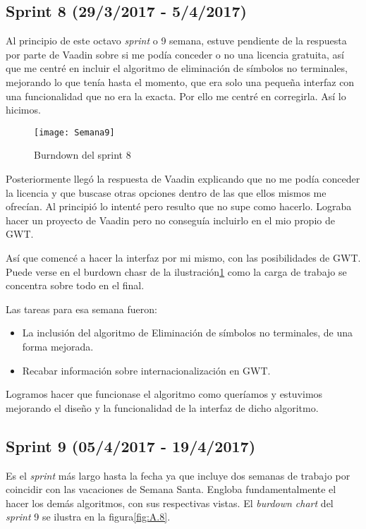 \subsection{Sprint 8 (29/3/2017 - 5/4/2017)}

Al principio de este octavo \emph{sprint} o 9 semana, estuve pendiente de la respuesta por parte de Vaadin sobre si me podía conceder o no una licencia gratuita, así que me centré en incluir el algoritmo de eliminación de símbolos no terminales, mejorando lo que tenía hasta el momento, que era solo una pequeña interfaz con una funcionalidad que no era la exacta. Por ello me centré en corregirla. Así lo hicimos.

\begin{figure}[h]
\centering
\texttt{[image: Semana9]}
\caption{Burndown del sprint 8}
\label{fig:A.7}
\end{figure}

Posteriormente llegó la respuesta de Vaadin explicando que no me podía conceder la licencia y que buscase otras opciones dentro de las que ellos mismos me ofrecían. Al principió lo intenté pero resulto que no supe como hacerlo. Lograba hacer un proyecto de Vaadin pero no conseguía incluirlo en el mio propio de GWT.

Así que comencé a hacer la interfaz por mi mismo, con las posibilidades de GWT. Puede verse en el burdown chasr de la ilustración\ref{fig:A.7} como la carga de trabajo se concentra sobre todo en el final.

Las tareas para esa semana fueron: 

\begin{itemize}
\item La inclusión del algoritmo de Eliminación de símbolos no terminales, de una forma mejorada.
\item Recabar información sobre internacionalización en GWT.
\end{itemize}

Logramos hacer que funcionase el algoritmo como queríamos y estuvimos mejorando el diseño y la funcionalidad de la interfaz de dicho algoritmo.

\subsection{Sprint 9 (05/4/2017 - 19/4/2017)}

Es el \emph{sprint} más largo hasta la fecha ya que incluye dos semanas de trabajo por coincidir con las vacaciones de Semana Santa. Engloba fundamentalmente el hacer los demás algoritmos, con sus respectivas vistas. El \emph{burdown chart} del \emph{sprint} 9 se ilustra en la figura\ref{fig:A.8}.

